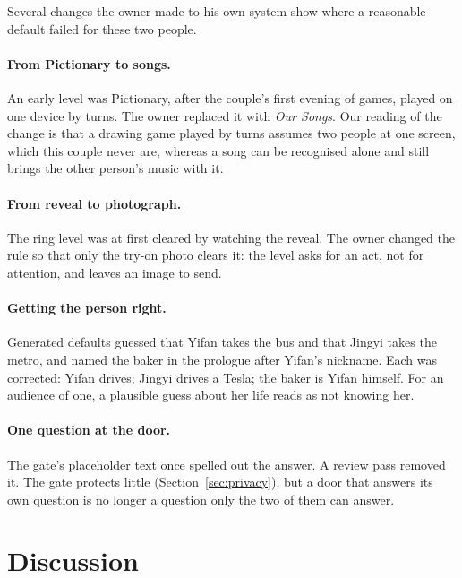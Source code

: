 \documentclass[sigconf,nonacm]{acmart}
\begin{document}
Several changes the owner made to his own system show where a reasonable default failed for these
two people.

\paragraph{From Pictionary to songs.} An early level was Pictionary, after the couple's first
evening of games, played on one device by turns. The owner replaced it with \emph{Our Songs}. Our
reading of the change is that a drawing game played by turns assumes two people at one screen,
which this couple never are, whereas a song can be recognised alone and still brings the other
person's music with it.

\paragraph{From reveal to photograph.} The ring level was at first cleared by watching the reveal.
The owner changed the rule so that only the try-on photo clears it: the level asks for an act, not
for attention, and leaves an image to send.

\paragraph{Getting the person right.} Generated defaults guessed that Yifan takes the bus and that
Jingyi takes the metro, and named the baker in the prologue after Yifan's nickname. Each was
corrected: Yifan drives; Jingyi drives a Tesla; the baker is Yifan himself. For an audience of one,
a plausible guess about her life reads as not knowing her.

\paragraph{One question at the door.} The gate's placeholder text once spelled out the answer.
A review pass removed it. The gate protects little (Section~\ref{sec:privacy}), but a door that
answers its own question is no longer a question only the two of them can answer.

\section{Discussion}\label{sec:discussion}
\end{document}
